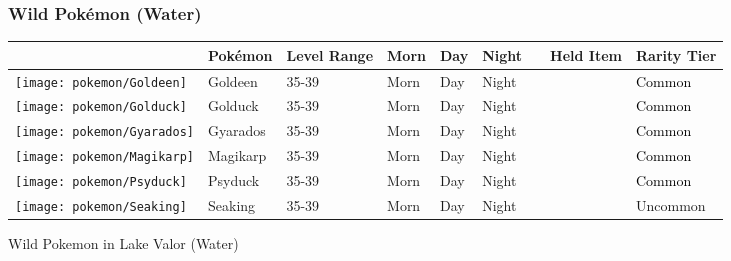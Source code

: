 \subsubsection{Wild Pokémon (Water)}%
\label{ssubsec:WildPokmon(Water)}%
\begin{longtable}{||l l l l l l l l l||}%
\hline%
\rowcolor{WaterColor}%
&Pokémon&Level Range&Morn&Day&Night&&Held Item&Rarity Tier\\%
\hline%
\endhead%
\hline%
\rowcolor{WaterColor}%
\texttt{[image: pokemon/Goldeen]}&Goldeen&35{-}39&Morn&Day&Night&&&\textcolor{black}{%
Common%
}\\%
\hline%
\rowcolor{WaterColor}%
\texttt{[image: pokemon/Golduck]}&Golduck&35{-}39&Morn&Day&Night&&&\textcolor{black}{%
Common%
}\\%
\hline%
\rowcolor{WaterColor}%
\texttt{[image: pokemon/Gyarados]}&Gyarados&35{-}39&Morn&Day&Night&&&\textcolor{black}{%
Common%
}\\%
\hline%
\rowcolor{WaterColor}%
\texttt{[image: pokemon/Magikarp]}&Magikarp&35{-}39&Morn&Day&Night&&&\textcolor{black}{%
Common%
}\\%
\hline%
\rowcolor{WaterColor}%
\texttt{[image: pokemon/Psyduck]}&Psyduck&35{-}39&Morn&Day&Night&&&\textcolor{black}{%
Common%
}\\%
\hline%
\rowcolor{WaterColor}%
\texttt{[image: pokemon/Seaking]}&Seaking&35{-}39&Morn&Day&Night&&&\textcolor{OliveGreen}{%
Uncommon%
}\\%
\hline%
\end{longtable}%
\caption{Wild Pokemon in Lake Valor (Water)}